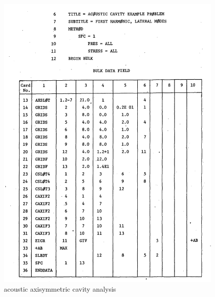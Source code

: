 \documentclass{article}
\begin{document}
\begin{figure}[v]
    \centering
\includegraphics[scale=0.4]{nastran_fig3}
    \caption{acoustic axisymmetric cavity analysis}
\end{figure}
\end{document}
